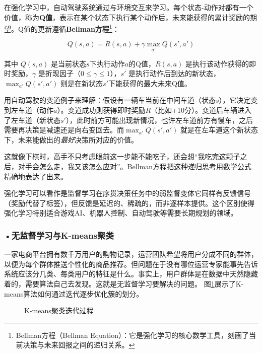 在强化学习中，自动驾驶系统通过与环境交互来学习。每个状态-动作对都有一个价值，称为\textbf{Q值}，表示在某个状态下执行某个动作后，未来能获得的累计奖励的期望。Q值的更新遵循\textbf{Bellman方程}\footnote{Bellman方程（Bellman Equation）：它是强化学习的核心数学工具，刻画了当前决策与未来回报之间的递归关系。}：


\[
Q(s,a) = R(s,a) + \gamma \max_{a'} Q(s',a')
\]


其中 $Q(s,a)$ 是当前状态$s$下执行动作$a$的Q值，$R(s,a)$ 是执行该动作获得的即时奖励，$\gamma$ 是折现因子（$0 \leq \gamma \leq 1$），$s'$ 是执行动作后到达的新状态，$\max_{a'} Q(s',a')$ 则是在新状态$s'$下能获得的最大未来Q值。

用自动驾驶的变道例子来理解：假设有一辆车当前在中间车道（状态$s$），它决定变到左车道（动作$a$）。变道成功则获得即时奖励$R$（比如+10分）。变道后车辆进入了左车道（新状态$s'$），此时前方可能出现新情况，也许左车道前方有慢车，之后需要再决策是减速还是向右变回去。而$\max_{a'} Q(s',a')$ 就是在左车道这个新状态下，未来能做出的\emph{最好}决策所对应的价值。

这就像下棋时，高手不只考虑眼前这一步能不能吃子，还会想“我吃完这颗子之后，对手会怎么走，我又该怎么应对”。Bellman方程把这种递归思考用数学公式精确地表达了出来。

强化学习可以看作是监督学习在序贯决策任务中的弱监督变体它同样有反馈信号（奖励代替了标签），但反馈是延迟的、稀疏的，而非逐样本提供。这个区别使得强化学习特别适合游戏AI、机器人控制、自动驾驶等需要长期规划的领域。



\subsubsection*{\textbf{•无监督学习与K-means聚类}}

一家电商平台拥有数千万用户的购物记录，运营团队希望将用户分成不同的群体，以便为每个群体推送个性化的商品推荐。但问题在于没有哪位运营专家能事先告诉系统应该分几类、每类用户的特征是什么。事实上，用户群体是在数据中天然隐藏着的，需要算法自己去发现。这就是无监督学习要解决的问题。
图\ref{fig:ch2_2_4}展示了K-means算法如何通过迭代逐步优化簇的划分。

\begin{figure}[H]
\centering
{}
\caption{K-means聚类迭代过程}
\label{fig:ch2_2_4}
\end{figure}


